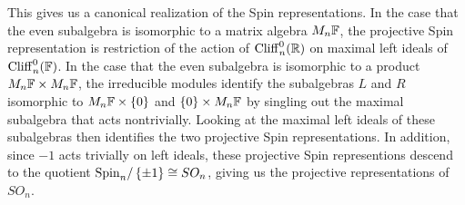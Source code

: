 This gives us a canonical realization of the Spin representations. In the
case that the even subalgebra is isomorphic to a matrix algebra $M_n\mathbb{F}$,
the projective Spin representation is restriction of the action of
$\operatorname{Cliff}_n^0(\mathbb{R})$ on maximal left ideals of $\operatorname{Cliff}_n^0(\mathbb{F})$. In the case
that the even subalgebra is isomorphic to a product $M_n\mathbb{F} \times M_n\mathbb{F}$,
the irreducible modules identify the subalgebras $L$ and $R$
isomorphic to $M_n\mathbb{F} \times \left\lbrace 0 \right\rbrace$ and $\left\lbrace 0 \right\rbrace \times M_n\mathbb{F}$ by singling out
the maximal subalgebra that acts nontrivially. Looking at the maximal left ideals
of these subalgebras then identifies the two projective Spin representations.
In addition, since $-1$ acts trivially on left ideals, these projective
Spin representions descend to the quotient $\mathrm{Spin}_n / \left\lbrace \pm 1 \right\rbrace \cong SO_n$,
giving us the projective representations of $SO_n$.
%